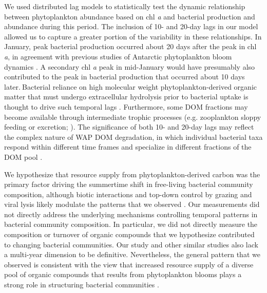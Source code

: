 We used distributed lag models to statistically test the dynamic relationship between phytoplankton abundance based on chl \textit{a} and bacterial production and abundance during this period. The inclusion of 10- and 20-day lags in our model allowed us to capture a greater portion of the variability in these relationships. In January, peak bacterial production occurred about 20 days after the peak in chl \textit{a}, in agreement with previous studies of Antarctic phytoplankton bloom dynamics \citep{billen1991phytoplankton,ducklow2001seasonal}. A secondary chl \textit{a} peak in mid-January would have presumably also contributed to the peak in bacterial production that occurred about 10 days later.${~}$Bacterial reliance on high molecular weight phytoplankton-derived organic matter that must undergo extracellular hydrolysis prior to bacterial uptake is thought to drive such temporal lags \citep{billen1991phytoplankton,ducklow2001seasonal,lancelot1991modelling,kirchman2001glucose}. Furthermore, some DOM fractions may become available through intermediate trophic processes (e.g. zooplankton sloppy feeding or excretion; \citealt{dsvse12}). The significance of both 10- and 20-day lags may reflect the complex nature of WAP DOM degradation, in which individual bacterial taxa respond within different time frames and specialize in different fractions of the DOM pool \citep{nikrad2014uptake,bowman2015microbial,kim2016decedal}.

We hypothesize that resource supply from phytoplankton-derived carbon was the primary factor driving the summertime shift in free-living bacterial community composition, although biotic interactions and top-down control by grazing and viral lysis likely modulate the patterns that we observed \citep{bird1999uncoupling,Brum2016-ig}. Our measurements did not directly address the underlying mechanisms controlling temporal patterns in bacterial community composition. In particular, we did not directly measure the composition or turnover of organic compounds that we hypothesize contributed to changing bacterial communities. Our study and other similar studies also lack a multi-year dimension to be definitive. Nevertheless, the general pattern that we observed is consistent with the view that increased resource supply of a diverse pool of organic compounds that results from phytoplankton blooms plays a strong role in structuring bacterial communities \citep{Teeling2012-jz,Buchan2014-yh}. 

